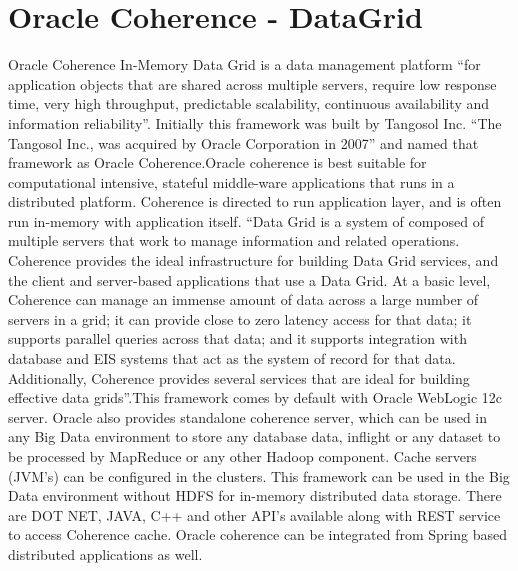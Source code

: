 \section{Oracle Coherence - DataGrid}

Oracle Coherence In-Memory Data Grid is a data management platform “for application objects that are shared across multiple servers, 
require low response time, very high throughput, predictable scalability, 
continuous availability and information reliability”\cite{hid-sp18-514-OracleCoherence}. 
Initially this framework was built by Tangosol Inc. “The Tangosol Inc., 
was acquired by Oracle Corporation in 2007”\cite{hid-sp18-514-coherencewiki} 
and named that framework as Oracle Coherence.Oracle coherence is best suitable for computational intensive, 
stateful middle-ware applications that runs in a distributed platform. 
Coherence is directed to run application layer, and is often run in-memory with application itself. 
“Data Grid is a system of composed of multiple servers that work to manage information and related operations. Coherence provides the ideal infrastructure for building Data Grid services, and the client and server-based applications that use a Data Grid. At a basic level, Coherence can manage an immense amount of data across a large number of servers in a grid; 
it can provide close to zero latency access for that data; it supports parallel queries across that data; and it supports integration with database and EIS systems that act as the system of record for that data. Additionally, 
Coherence provides several services that are ideal for building effective data grids”\cite{hid-sp18-514-OracleCoherence}.This framework comes by default with Oracle WebLogic 12c server. 
Oracle also provides standalone coherence server, which can be used in any Big Data environment to store any database data, inflight or any dataset to be processed by MapReduce or any other Hadoop component. Cache servers (JVM’s) can be configured in the clusters. This framework can be used in the Big Data environment without HDFS for in-memory distributed data storage. 
There are DOT NET, JAVA, C++ and other API’s available along with REST service to access Coherence cache\cite{hid-sp18-514-OracleCoherence}. Oracle coherence can be integrated from Spring based distributed applications as well\cite{hid-sp18-514-CoherenceSpringInt}.

